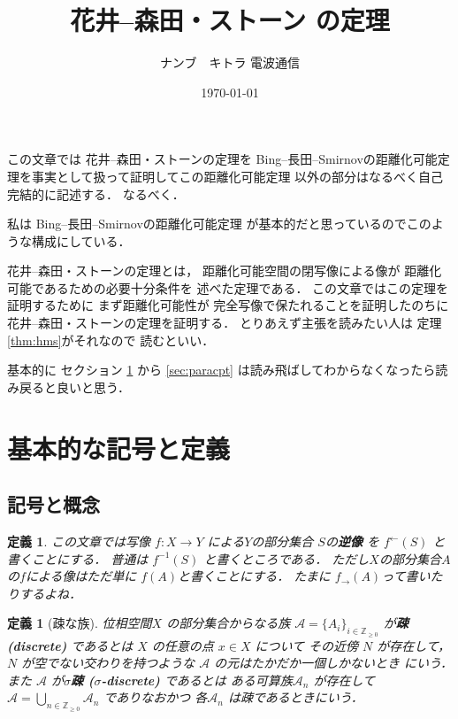 \documentclass[leqno, a4paper, 12pt]{jsarticle}
\title{
花井--森田・ストーン
の定理
}
\author{ナンブ　キトラ 電波通信}
\date{\today}
\newtheorem{df}[thm]{定義}
\newcommand{\zz}{\mathbb{Z}}
\newcommand{\myinv}[1]{#1^{\gets}}
\begin{document}
\maketitle






この文章では
花井--森田・ストーンの定理を
Bing--長田--Smirnovの距離化可能定理を事実として扱って証明してこの距離化可能定理
以外の部分はなるべく自己完結的に記述する．
なるべく．

私は
Bing--長田--Smirnovの距離化可能定理
が基本的だと思っているのでこのような構成にしている．

花井--森田・ストーンの定理とは，
距離化可能空間の閉写像による像が
距離化可能であるための必要十分条件を
述べた定理である．
この文章ではこの定理を証明するために
まず距離化可能性が
完全写像で保たれることを証明したのちに
花井--森田・ストーンの定理を証明する．
とりあえず主張を読みたい人は
定理\ref{thm:hms}がそれなので
読むといい．


基本的に
セクション
\ref{sec:basis}
から
\ref{sec:paracpt}
は読み飛ばしてわからなくなったら読み戻ると良いと思う．


\setcounter{tocdepth}{1}
\tableofcontents


\section{基本的な記号と定義}\label{sec:basis}


\subsection{記号と概念}
\begin{df}
この文章では写像
$f\colon X\to Y$
による$Y$の部分集合
$S$の\textbf{逆像}
を
$\myinv{f}(S)$
と書くことにする．
普通は
$f^{-1}(S)$
と書くところである．
ただし$X$の部分集合$A$
の$f$による像はただ単に
$f(A)$と書くことにする．
たまに
$f_{\to}(A)$って書いたりするよね．
\end{df}


\begin{df}[疎な族]
位相空間$X$
の部分集合からなる族
$\mathcal{A}=\{A_{i}\}_{i\in \zz_{\ge 0}}$
が\textbf{疎(discrete)}
であるとは
$X$
の任意の点
$x\in X$
について
その近傍
$N$
が存在して，
$N$
が空でない交わりを持つような
$\mathcal{A}$
の元はたかだか一個しかないとき
にいう．
また
$\mathcal{A}$
が\textbf{$\sigma$疎 ($\sigma$-discrete)}
であるとは
ある可算族$\mathcal{A}_{n}$
が存在して
$\mathcal{A}=\bigcup_{n\in \zz_{\ge 0}}\mathcal{A}_{n}$
でありなおかつ
各$\mathcal{A}_{n}$
は疎であるときにいう．
\end{df}
\end{document}
